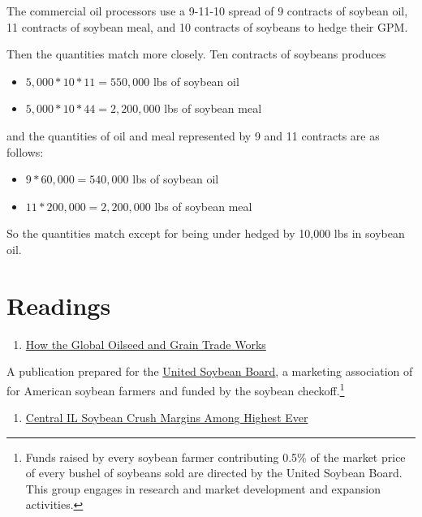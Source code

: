 \documentclass[
]{book}
\providecommand{\tightlist}{%
  \setlength{\itemsep}{0pt}\setlength{\parskip}{0pt}}
\begin{document}
The commercial oil processors use a 9-11-10 spread of 9 contracts of soybean oil, 11 contracts of soybean meal, and 10 contracts of soybeans to hedge their GPM.

Then the quantities match more closely. Ten contracts of soybeans produces

\begin{itemize}
\tightlist
\item
  \(5,000*10*11 = 550,000\) lbs of soybean oil
\item
  \(5,000*10*44 = 2,200,000\) lbs of soybean meal
\end{itemize}

and the quantities of oil and meal represented by 9 and 11 contracts are as follows:

\begin{itemize}
\tightlist
\item
  \(9*60,000 = 540,000\) lbs of soybean oil
\item
  \(11*200,000 = 2,200,000\) lbs of soybean meal
\end{itemize}

So the quantities match except for being under hedged by 10,000 lbs in soybean oil.

\hypertarget{readings-4}{%
\section{Readings}\label{readings-4}}

\begin{enumerate}
\def\labelenumi{\arabic{enumi}.}
\tightlist
\item
  \href{http://unitedsoybean.org/wp-content/uploads/2013/07/RevisedJan12_GlobalOilSeedGrainTrade_2011.pdf}{How the Global Oilseed and Grain Trade Works}
\end{enumerate}

A publication prepared for the \href{http://unitedsoybean.org/}{United Soybean Board}, a marketing association of for American soybean farmers and funded by the soybean checkoff.\footnote{Funds raised by every soybean farmer contributing 0.5\% of the market price of every bushel of soybeans sold are directed by the United Soybean Board. This group engages in research and market development and expansion activities.}

\begin{enumerate}
\def\labelenumi{\arabic{enumi}.}
\setcounter{enumi}{1}
\tightlist
\item
  \href{http://www.dtnprogressivefarmer.com/dtnag/common/link.do;jsessionid=CA98693F5E3C9EF37EC1F032464A6388.agfreejvm1?symbolicName=/ag/blogs/template1\&blogHandle=agfundamental\&blogEntryId=8a82c0bc372e8fba0137a8324dd704cf}{Central IL Soybean Crush Margins Among Highest Ever}
\end{enumerate}
\end{document}
